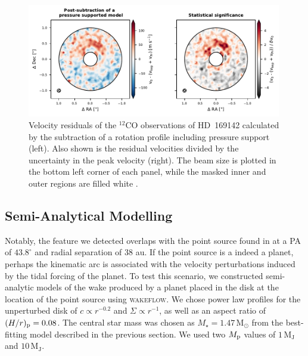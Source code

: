 \begin{figure}
    \centering
    \includegraphics[width = 0.99\textwidth]{figures/garg_arc.pdf}
    \caption{Velocity residuals of the $^{12}$CO observations of HD~169142 calculated by the subtraction of a rotation profile including pressure support (left). Also shown is the residual velocities divided by the uncertainty in the peak velocity (right). The beam size is plotted in the bottom left corner of each panel, while the masked inner and outer regions are filled white \citep{garg2022}.}
    \label{fig:garg_arc}
\end{figure}

\subsection{Semi-Analytical Modelling} \label{sec:garg_analytics}

Notably, the feature we detected overlaps with the point source found in \citet{gratton2019} at a PA of $43.8^\circ$ and radial separation of $38$ au.
If the point source is a indeed a planet, perhaps the kinematic arc is associated with the velocity perturbations induced by the tidal forcing of the planet.
To test this scenario, we constructed semi-analytic models of the wake produced by a planet placed in the disk at the location of the \citet{gratton2019} point source using \textsc{wakeflow}.
We chose power law profiles for the unperturbed disk of $c \propto r^{-0.2}$ and $\Sigma \propto r^{-1}$, as well as an aspect ratio of $(H/r)_{\rm p}=0.08$.
The central star mass was chosen as $M_\star = 1.47 \, \mathrm{M_\odot}$ from the best-fitting model described in the previous section.
We used two $M_{\rm p}$ values of $1 \, \mathrm{M_J}$ and $10 \, \mathrm{M_J}$.

